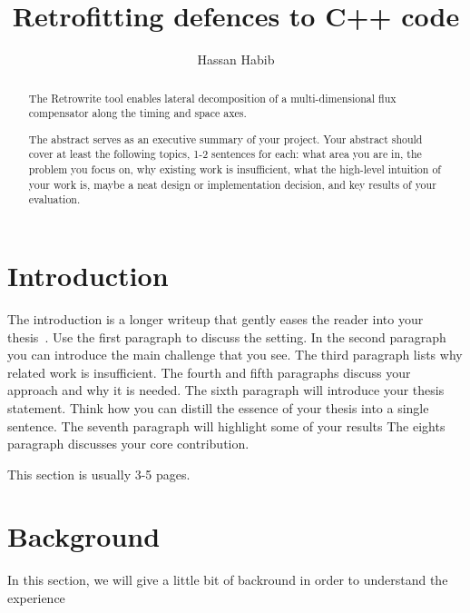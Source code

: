 \documentclass[a4paper,11pt,oneside]{report}
\title{Retrofitting defences to C++ code}
\author{Hassan Habib}
\newcommand{\sysname}{Retrowrite\xspace}
\begin{document}
\maketitle

\begin{abstract}
    The \sysname tool enables lateral decomposition of a multi-dimensional
    flux compensator along the timing and space axes.

    The abstract serves as an executive summary of your project.
    Your abstract should cover at least the following topics, 1-2 sentences for
    each: what area you are in, the problem you focus on, why existing work is
    insufficient, what the high-level intuition of your work is, maybe a neat
    design or implementation decision, and key results of your evaluation.

\end{abstract}


\maketoc

\chapter{Introduction}

The introduction is a longer writeup that gently eases the reader into your
thesis~\cite{dinesh20oakland}. Use the first paragraph to discuss the setting.
In the second paragraph you can introduce the main challenge that you see.
The third paragraph lists why related work is insufficient.
The fourth and fifth paragraphs discuss your approach and why it is needed.
The sixth paragraph will introduce your thesis statement. Think how you can
distill the essence of your thesis into a single sentence.
The seventh paragraph will highlight some of your results
The eights paragraph discusses your core contribution.

This section is usually 3-5 pages.

\chapter{Background}
In this section, we will give a little bit of backround in order to understand
the experience
\end{document}
